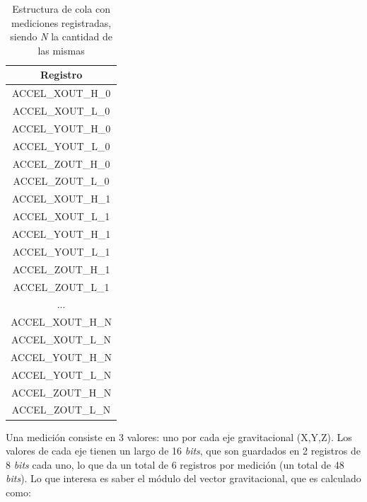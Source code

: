 \documentclass{article}
\begin{document}
    \begin{table}[h]
        \centering
        \begin{tabular}{||c||} 
            \hline
            Registro \\ [0.5ex] 
            \hline\hline
            ACCEL\_XOUT\_H\_0 \\ 
            \hline
            ACCEL\_XOUT\_L\_0 \\ 
            \hline
            ACCEL\_YOUT\_H\_0 \\ 
            \hline
            ACCEL\_YOUT\_L\_0 \\ 
            \hline
            ACCEL\_ZOUT\_H\_0 \\ 
            \hline
            ACCEL\_ZOUT\_L\_0 \\ 
            \hline
            ACCEL\_XOUT\_H\_1 \\ 
            \hline
            ACCEL\_XOUT\_L\_1 \\ 
            \hline
            ACCEL\_YOUT\_H\_1 \\ 
            \hline
            ACCEL\_YOUT\_L\_1 \\ 
            \hline
            ACCEL\_ZOUT\_H\_1 \\ 
            \hline
            ACCEL\_ZOUT\_L\_1 \\ 
            \hline
            ... \\ 
            \hline
            ACCEL\_XOUT\_H\_N \\ 
            \hline
            ACCEL\_XOUT\_L\_N \\ 
            \hline
            ACCEL\_YOUT\_H\_N \\ 
            \hline
            ACCEL\_YOUT\_L\_N \\ 
            \hline
            ACCEL\_ZOUT\_H\_N \\ 
            \hline
            ACCEL\_ZOUT\_L\_N \\ 
            \hline
        \end{tabular}
        \caption{Estructura de cola con mediciones registradas, siendo \emph{N} la 
        cantidad de las mismas}
        \label{tab:registros}
    \end{table}

    Una medición consiste en 3 valores: uno por cada eje gravitacional (X,Y,Z).
    Los valores de cada eje tienen un largo de 16 \emph{bits}, que son guardados
    en 2 registros de 8 \emph{bits} cada uno, lo que da un total de 6 registros 
    por medición (un total de 48 \emph{bits}). Lo que interesa es saber el 
    módulo del vector gravitacional, que es calculado como:
    
\end{document}
